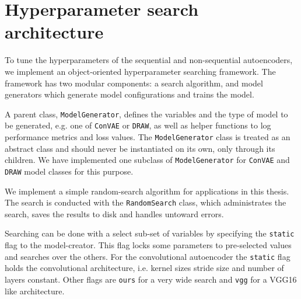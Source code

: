 \section{Hyperparameter search architecture}\label{sec:hyperparam_search_arch}


To tune the hyperparameters of the sequential and non-sequential autoencoders, we implement an object-oriented hyperparameter searching framework. The framework has two modular components: a search algorithm, and model generators which generate model configurations and trains the model. 

A parent class, \lstinline{ModelGenerator}, defines the variables and the type of model to be generated, e.g. one of \lstinline{ConVAE} or \lstinline{DRAW}, as well as helper functions to log performance metrics and loss values. The \lstinline{ModelGenerator} class is treated as an abstract class and should never be instantiated on its own, only through its children. We have implemented one subclass of  \lstinline{ModelGenerator} for  \lstinline{ConVAE} and \lstinline{DRAW} model classes for this purpose. 

We implement a simple random-search algorithm for applications in this thesis. The search is conducted with the \lstinline{RandomSearch} class, which administrates the search, saves the results to disk and handles untoward errors. 

Searching can be done with a select sub-set of variables by specifying the \lstinline{static} flag to the model-creator. This flag locks some parameters to pre-selected values and searches over the others. For the convolutional autoencoder the \lstinline{static} flag holds the convolutional architecture, i.e. kernel sizes stride size and number of layers constant. Other flags are \lstinline{ours} for a very wide search and \lstinline{vgg} for a VGG16 like architecture.